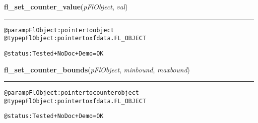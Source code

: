     \label{xformslib:flcounter:fl_set_counter_value}

    \vspace{0.5ex}

\hspace{.8\funcindent}\begin{boxedminipage}{\funcwidth}

    \raggedright \textbf{fl\_set\_counter\_value}(\textit{pFlObject}, \textit{val})

    \vspace{-1.5ex}

    \rule{\textwidth}{0.5\fboxrule}
\setlength{\parskip}{2ex}
\begin{alltt}
        @param pFlObject: pointer to object
@type pFlObject: pointer to xfdata.FL\_OBJECT

        @status: Tested + NoDoc + Demo = OK
    
\end{alltt}

\setlength{\parskip}{1ex}
    \end{boxedminipage}

    \label{xformslib:flcounter:fl_set_counter_bounds}

    \vspace{0.5ex}

\hspace{.8\funcindent}\begin{boxedminipage}{\funcwidth}

    \raggedright \textbf{fl\_set\_counter\_bounds}(\textit{pFlObject}, \textit{minbound}, \textit{maxbound})

    \vspace{-1.5ex}

    \rule{\textwidth}{0.5\fboxrule}
\setlength{\parskip}{2ex}
\begin{alltt}
        @param pFlObject: pointer to counter object
@type pFlObject: pointer to xfdata.FL\_OBJECT

        @status: Tested + NoDoc + Demo = OK
    
\end{alltt}

\setlength{\parskip}{1ex}
    \end{boxedminipage}

